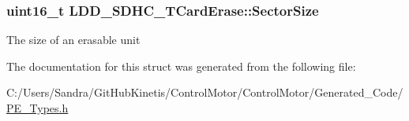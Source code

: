 \subsubsection[{\texorpdfstring{Sector\+Size}{SectorSize}}]{\setlength{\rightskip}{0pt plus 5cm}uint16\+\_\+t L\+D\+D\+\_\+\+S\+D\+H\+C\+\_\+\+T\+Card\+Erase\+::\+Sector\+Size}\hypertarget{struct_l_d_d___s_d_h_c___t_card_erase_a3c0c33e89b65f4f6bfd6043585df5486}{}\label{struct_l_d_d___s_d_h_c___t_card_erase_a3c0c33e89b65f4f6bfd6043585df5486}
The size of an erasable unit 

The documentation for this struct was generated from the following file\+:\begin{DoxyCompactItemize}
\item 
C\+:/\+Users/\+Sandra/\+Git\+Hub\+Kinetis/\+Control\+Motor/\+Control\+Motor/\+Generated\+\_\+\+Code/\hyperlink{_p_e___types_8h}{P\+E\+\_\+\+Types.\+h}\end{DoxyCompactItemize}
